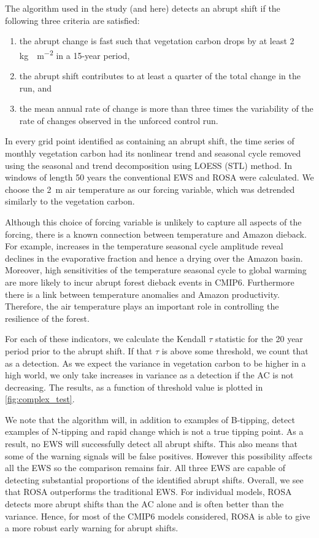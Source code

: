 The algorithm used in the study (and here) detects an abrupt shift if the following three criteria are satisfied:
\begin{enumerate}
\item the abrupt change is fast such that vegetation carbon drops by at least 2 \si{\kilogram\carbon\per\meter\squared} in a 15-year period,
\item the abrupt shift contributes to at least a quarter of the total change in the run, and
\item the mean annual rate of change is more than three times the variability of the rate of changes observed in the unforced control run. 
\end{enumerate}
In every grid point identified as containing an abrupt shift, the time series of monthly vegetation carbon had its nonlinear trend and seasonal cycle removed
using the seasonal and trend decomposition using
LOESS (STL) method\cite{Cleaveland1990}. In 
windows of length 50 years the conventional EWS and ROSA were calculated.
We choose the \si{2\meter} air temperature as our forcing variable, which
was detrended similarly to the vegetation carbon. 

Although this choice of forcing variable is unlikely to capture all aspects
of the forcing, there is a known connection between temperature and Amazon 
dieback. For example, increases in the temperature seasonal cycle amplitude reveal declines in the evaporative fraction and hence a drying over the Amazon basin\cite{Ritchie2022}.
Moreover, high sensitivities of the temperature seasonal cycle to global warming are more likely to incur abrupt forest dieback events\cite{Parry2022} in CMIP6.
Furthermore there is a link between temperature anomalies and Amazon productivity\cite{Boulton2013}.
Therefore, the air temperature plays an important role in controlling the resilience of the forest.

For each of these indicators, we calculate the Kendall $\tau$ statistic for the
20 year period prior to the abrupt shift. If that $\tau$ is above some threshold, we 
count that as a detection. As we expect the variance in vegetation carbon to be higher 
in a high  world, we only take increases in variance as a detection if
the AC is not decreasing. The results, as a function of threshold value
is plotted in \cref{fig:complex_test}.

We note that the algorithm will, in addition to examples of B-tipping, detect examples
of N-tipping and rapid change which is not a true tipping point. As a result, no 
EWS will successfully detect all abrupt shifts. This also means that some
of the warning signals will be false positives. However this possibility
affects all the EWS so the comparison remains fair. All three EWS are capable
of detecting substantial proportions of the identified abrupt shifts. Overall, we see that ROSA outperforms the traditional EWS.
For individual models,
ROSA detects more abrupt shifts than the AC alone and is often better than the 
variance. Hence, for most of the CMIP6 models considered, ROSA is able to give a more robust
early warning for abrupt shifts.

